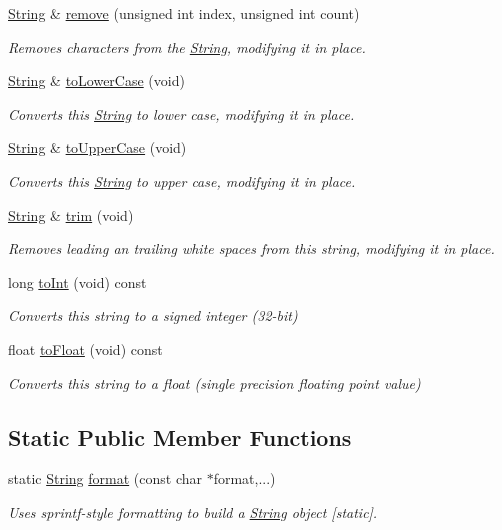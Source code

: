 \begin{DoxyCompactItemize}
\hyperlink{class_string}{String} \& \hyperlink{class_string_ab27df1671530a95f2d8308fe179729e0}{remove} (unsigned int index, unsigned int count)
\begin{DoxyCompactList}\small\item\em Removes characters from the \hyperlink{class_string}{String}, modifying it in place. \end{DoxyCompactList}\item 
\hyperlink{class_string}{String} \& \hyperlink{class_string_ab281c09b3379e2ab74fa35f619f1d7ad}{to\+Lower\+Case} (void)
\begin{DoxyCompactList}\small\item\em Converts this \hyperlink{class_string}{String} to lower case, modifying it in place. \end{DoxyCompactList}\item 
\hyperlink{class_string}{String} \& \hyperlink{class_string_ad911fa09bbf609765ed4a0c8eecbe96f}{to\+Upper\+Case} (void)
\begin{DoxyCompactList}\small\item\em Converts this \hyperlink{class_string}{String} to upper case, modifying it in place. \end{DoxyCompactList}\item 
\hyperlink{class_string}{String} \& \hyperlink{class_string_ab479206db8365accc3ee40108798f8dc}{trim} (void)
\begin{DoxyCompactList}\small\item\em Removes leading an trailing white spaces from this string, modifying it in place. \end{DoxyCompactList}\item 
long \hyperlink{class_string_a2dc5a9a787f8ff266d1130594ec65237}{to\+Int} (void) const
\begin{DoxyCompactList}\small\item\em Converts this string to a signed integer (32-\/bit) \end{DoxyCompactList}\item 
float \hyperlink{class_string_ac501497ce1ba7679e80152eaa71c9986}{to\+Float} (void) const
\begin{DoxyCompactList}\small\item\em Converts this string to a float (single precision floating point value) \end{DoxyCompactList}\end{DoxyCompactItemize}
\subsection*{Static Public Member Functions}
\begin{DoxyCompactItemize}
\item 
static \hyperlink{class_string}{String} \hyperlink{class_string_a735dfb188ddcaaddbcb42cc3a9e59afc}{format} (const char $\ast$format,...)
\begin{DoxyCompactList}\small\item\em Uses sprintf-\/style formatting to build a \hyperlink{class_string}{String} object \mbox{[}static\mbox{]}. \end{DoxyCompactList}\end{DoxyCompactItemize}
